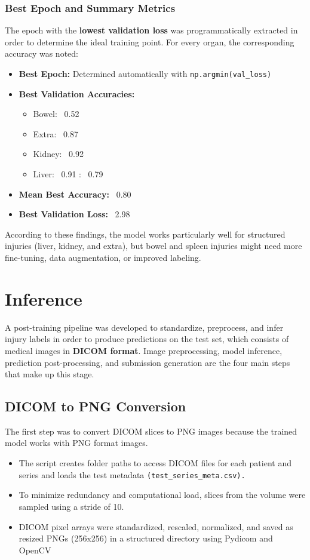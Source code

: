 \documentclass[a4paper,12pt]{article}
\begin{document}
\subsubsection{Best Epoch and Summary Metrics}
The epoch with the \textbf{lowest validation loss} was programmatically extracted in order to determine the ideal training point. For every organ, the corresponding accuracy was noted:

\begin{itemize}
    \item \textbf{Best Epoch:} Determined automatically with \verb|np.argmin(val_loss)|
    \item \textbf{Best Validation Accuracies:}
    \begin{itemize}
        \item Bowel: ~0.52
        \item Extra: ~0.87
        \item Kidney: ~0.92
        \item Liver: ~0.91
        \itemSpleen: ~0.79
    \end{itemize}
    \item \textbf{Mean Best Accuracy:} ~0.80
    \item \textbf{Best Validation Loss:} ~2.98
\end{itemize}

According to these findings, the model works particularly well for structured injuries (liver, kidney, and extra), but bowel and spleen injuries might need more fine-tuning, data augmentation, or improved labeling.


\section{Inference}
A post-training pipeline was developed to standardize, preprocess, and infer injury labels in order to produce predictions on the test set, which consists of medical images in \textbf{DICOM format}. Image preprocessing, model inference, prediction post-processing, and submission generation are the four main steps that make up this stage.

\subsection{DICOM to PNG Conversion}
The first step was to convert DICOM slices to PNG images because the trained model works with PNG format images.

\begin{itemize}
    \item The script creates folder paths to access DICOM files for each patient and series and loads the test metadata \verb|(test_series_meta.csv).|
    \item To minimize redundancy and computational load, slices from the volume were sampled using a stride of 10.
    \item DICOM pixel arrays were standardized, rescaled, normalized, and saved as resized PNGs (256x256) in a structured directory using Pydicom and OpenCV
\end{itemize}
\end{document}
